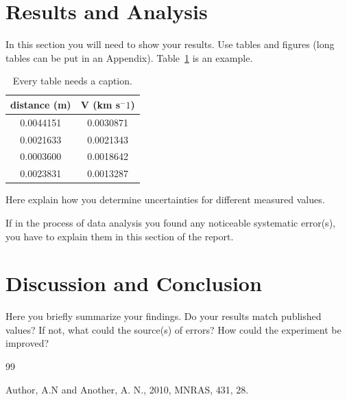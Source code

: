 \documentclass[letterpaper,11pt]{article}
\begin{document}
\section{Results and Analysis}

In this section you will need to show your results. Use tables and
figures (long tables can be put in an Appendix). Table~\ref{table1} is an example.

\begin{table}[ht]
\begin{center}
\caption{Every table needs a caption.}
\label{table1} 
\begin{tabular}{cc} 
\hline
\multicolumn{1}{c}{distance (m)} & \multicolumn{1}{c}{V (km s$^-1$)} \\
\hline
0.0044151 &   0.0030871 \\
0.0021633 &   0.0021343 \\
0.0003600 &   0.0018642 \\
0.0023831 &   0.0013287 \\
\hline
\end{tabular}
\end{center}
\end{table}

Here explain how you determine uncertainties for different
measured values.

If in the process of data analysis you found any noticeable systematic
error(s), you have to explain them in this section of the report.


\section{Discussion and Conclusion}
Here you briefly summarize your findings. Do your results match published values? If not, what could the source(s) of errors? How could the experiment be improved?

\begin{thebibliography}{99}

Author, A.N and Another, A. N., 2010, MNRAS, 431, 28.


\end{thebibliography}
\appendix
\end{document}
